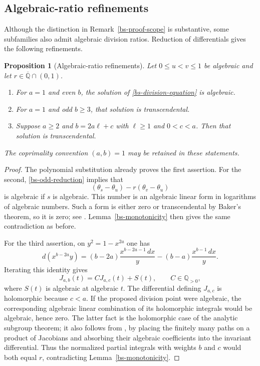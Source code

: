 \documentclass[11pt,a4paper]{article}
\newtheorem{proposition}[theorem]{Proposition}
\theoremstyle{definition}
\theoremstyle{remark}
\numberwithin{equation}{section}
\newcommand{\Qbar}{\overline{\mathbb Q}}
\begin{document}
\subsection{Algebraic-ratio refinements}

Although the distinction in Remark~\ref{bs-proof-scope} is substantive,
some subfamilies also admit algebraic division ratios.  Reduction of
differentials gives the following refinements.

\begin{proposition}[Algebraic-ratio refinements]
\label{bs-algebraic-ratios}
Let $0\le u<v\le1$ be algebraic and let $r\in\Qbar\cap(0,1)$.
\begin{enumerate}
\item For $a=1$ and even $b$, the solution of
\eqref{bs-division-equation} is algebraic.
\item For $a=1$ and odd $b\ge3$, that solution is transcendental.
\item Suppose $a\ge2$ and $b=2a\ell+c$ with $\ell\ge1$ and
$0<c<a$.  Then that solution is transcendental.
\end{enumerate}
The coprimality convention $(a,b)=1$ may be retained in these statements.
\end{proposition}

\begin{proof}
The polynomial substitution already proves the first assertion.
For the second, \eqref{bs-odd-reduction} implies that
\[
 (\theta_s-\theta_u)-r(\theta_v-\theta_u)
\]
is algebraic if $s$ is algebraic.  This number is an algebraic linear
form in logarithms of algebraic numbers.  Such a form is either zero
or transcendental by Baker's theorem, so it is zero; see
\cite[Proposition~15.10 and Remark~15.11]{lm-HuberWustholz}.
Lemma~\ref{bs-monotonicity}
then gives the same contradiction as before.

For the third assertion, on $y^2=1-x^{2a}$ one has
\[
 d(x^{b-2a}y)
   =(b-2a)\frac{x^{b-2a-1}\,dx}{y}
     -(b-a)\frac{x^{b-1}\,dx}{y}.
\]
Iterating this identity gives
\begin{equation}
 J_{a,b}(t)=C J_{a,c}(t)+S(t),
 \qquad C\in\mathbb Q_{>0},
 \label{bs-general-reduction}
\end{equation}
where $S(t)$ is algebraic at algebraic $t$.  The differential defining
$J_{a,c}$ is holomorphic because $c<a$.  If the proposed division point
were algebraic, the corresponding algebraic linear combination of its
holomorphic integrals would be algebraic, hence zero.  The latter fact
is the holomorphic case of the analytic subgroup theorem; it also
follows from \cite[Proposition~13.11]{lm-HuberWustholz}, by placing
the finitely many paths on a product of Jacobians and absorbing their
algebraic coefficients into the invariant differential.
Thus the normalized partial integrals with weights $b$ and $c$ would
both equal $r$, contradicting Lemma~\ref{bs-monotonicity}.
\end{proof}
\end{document}
